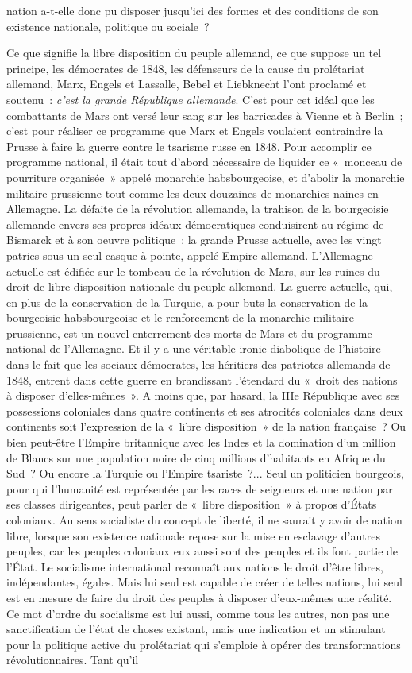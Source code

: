 \documentclass[french,twoside]{book} %
\begin{document}
nation a-t-elle donc pu disposer jusqu’ici des formes et des conditions de son existence nationale, politique ou sociale ?\par
Ce que signifie la libre disposition du peuple allemand, ce que suppose un tel principe, les démocrates de 1848, les défenseurs de la cause du prolétariat allemand, Marx, Engels et Lassalle, Bebel et Liebknecht l’ont proclamé et soutenu : \emph{c’est la grande République allemande}. C'est pour cet idéal que les combattants de Mars ont versé leur sang sur les barricades à Vienne et à Berlin ; c’est pour réaliser ce programme que Marx et Engels voulaient contraindre la Prusse à faire la guerre contre le tsarisme russe en 1848. Pour accomplir ce programme national, il était tout d’abord nécessaire de liquider ce « monceau de pourriture organisée » appelé monarchie habsbourgeoise, et d’abolir la monarchie militaire prussienne tout comme les deux douzaines de monarchies naines en Allemagne. La défaite de la révolution allemande, la trahison de la bourgeoisie allemande envers ses propres idéaux démocratiques conduisirent au régime de Bismarck et à son oeuvre politique : la grande Prusse actuelle, avec les vingt patries sous un seul casque à pointe, appelé Empire allemand. L'Allemagne actuelle est édifiée sur le tombeau de la révolution de Mars, sur les ruines du droit de libre disposition nationale du peuple allemand. La guerre actuelle, qui, en plus de la conservation de la Turquie, a pour buts la conservation de la bourgeoisie habsbourgeoise et le renforcement de la monarchie militaire prussienne, est un nouvel enterrement des morts de Mars et du programme national de l’Allemagne. Et il y a une véritable ironie diabolique de l’histoire dans le fait que les sociaux-démocrates, les héritiers des patriotes allemands de 1848, entrent dans cette guerre en brandissant l’étendard du « droit des nations à disposer d’elles-mêmes ». A moins que, par hasard, la IIIe République avec ses possessions coloniales dans quatre continents et ses atrocités coloniales dans deux continents soit l’expression de la « libre disposition » de la nation française ? Ou bien peut-être l’Empire britannique avec les Indes et la domination d’un million de Blancs sur une population noire de cinq millions d’habitants en Afrique du Sud ? Ou encore la Turquie ou l’Empire tsariste ?... Seul un politicien bourgeois, pour qui l’humanité est représentée par les races de seigneurs et une nation par ses classes dirigeantes, peut parler de « libre disposition » à propos d’États coloniaux. Au sens socialiste du concept de liberté, il ne saurait y avoir de nation libre, lorsque son existence nationale repose sur la mise en esclavage d’autres peuples, car les peuples coloniaux eux aussi sont des peuples et ils font partie de l’État. Le socialisme international reconnaît aux nations le droit d’être libres, indépendantes, égales. Mais lui seul est capable de créer de telles nations, lui seul est en mesure de faire du droit des peuples à disposer d’eux-mêmes une réalité. Ce mot d’ordre du socialisme est lui aussi, comme tous les autres, non pas une sanctification de l’état de choses existant, mais une indication et un stimulant pour la politique active du prolétariat qui s’emploie à opérer des transformations révolutionnaires. Tant qu’il 
\end{document}
